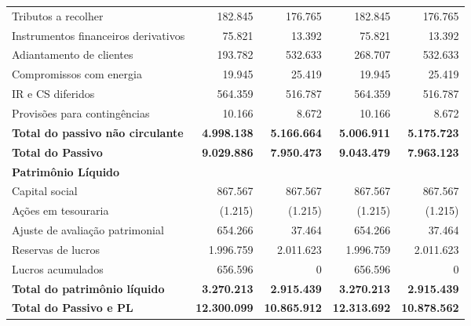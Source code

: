 \documentclass[1pt,a4paper]{article}
\begin{document}
\begin{longtable}{p{6cm} r r r r}
			Tributos a recolher & 182.845 & 176.765 & 182.845 & 176.765 \\
			Instrumentos financeiros derivativos & 75.821 & 13.392 & 75.821 & 13.392 \\
			Adiantamento de clientes & 193.782 & 532.633 & 268.707 & 532.633 \\
			Compromissos com energia & 19.945 & 25.419 & 19.945 & 25.419 \\
			IR e CS diferidos & 564.359 & 516.787 & 564.359 & 516.787 \\
			Provisões para contingências & 10.166 & 8.672 & 10.166 & 8.672 \\
			\rowcolor{darkgray}\textbf{Total do passivo não circulante} & \textbf{4.998.138} & \textbf{5.166.664} & \textbf{5.006.911} & \textbf{5.175.723} \\
			\midrule
			\rowcolor{darkgray}\textbf{Total do Passivo} & \textbf{9.029.886} & \textbf{7.950.473} & \textbf{9.043.479} & \textbf{7.963.123} \\
			\midrule
			\textbf{Patrimônio Líquido} & & & & \\
			Capital social & 867.567 & 867.567 & 867.567 & 867.567 \\
			Ações em tesouraria & (1.215) & (1.215) & (1.215) & (1.215) \\
			Ajuste de avaliação patrimonial & 654.266 & 37.464 & 654.266 & 37.464 \\
			Reservas de lucros & 1.996.759 & 2.011.623 & 1.996.759 & 2.011.623 \\
			Lucros acumulados & 656.596 & 0 & 656.596 & 0 \\
			\rowcolor{darkgray}\textbf{Total do patrimônio líquido} & \textbf{3.270.213} & \textbf{2.915.439} & \textbf{3.270.213} & \textbf{2.915.439} \\
			\midrule
			\rowcolor{darkgray}\textbf{Total do Passivo e PL} & \textbf{12.300.099} & \textbf{10.865.912} & \textbf{12.313.692} & \textbf{10.878.562} \\
			\bottomrule
		\end{longtable}
		
	
	
\end{document}
